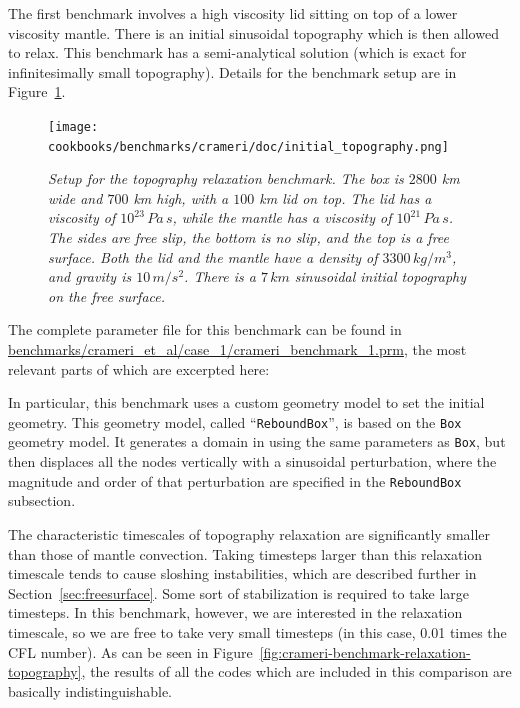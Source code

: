 \documentclass{article}
\begin{document}
The first benchmark involves a high viscosity lid sitting on top of a lower viscosity
mantle. There is an initial sinusoidal topography which is then allowed to relax.
This benchmark has a semi-analytical solution (which is exact for infinitesimally small
topography). Details for the benchmark setup are in Figure~\ref{fig:crameri-benchmark-initial-topography}.


\begin{figure}
  \begin{center}
    \texttt{[image: cookbooks/benchmarks/crameri/doc/initial\_topography.png]}
  \end{center}
  \caption{\it Setup for the topography relaxation benchmark. The box is $2800$ km wide and $700$ km high, with
    a $100$ km lid on top. The lid has a viscosity of $10^{23} \, {Pa\,s}$, while the mantle has a viscosity of $10^{21} \, {Pa\,s}$.  The sides are
    free slip, the bottom is no slip, and the top is a free surface.  Both the lid and the mantle have
    a density of $3300 \,{kg/m^3}$, and gravity is $10 \, {m/s^2}$. There is a $7 \, {km}$
    sinusoidal initial topography on the free surface.}
  \label{fig:crameri-benchmark-initial-topography}
\end{figure}

The complete parameter file for this benchmark can be found in
\url{benchmarks/crameri_et_al/case_1/crameri_benchmark_1.prm},
the  most relevant parts of which are excerpted here:

In particular, this benchmark uses a custom geometry model to set the initial geometry.
This geometry model, called ``\texttt{ReboundBox}'', is based on the \texttt{Box} geometry model.
It generates a domain in using the same parameters as \texttt{Box}, but then displaces all
the nodes vertically with a sinusoidal perturbation, where the magnitude and order of that
perturbation are specified in the \texttt{ReboundBox} subsection.


The characteristic timescales of topography relaxation are significantly smaller than those of
mantle convection. Taking timesteps larger than this relaxation timescale tends to cause sloshing
instabilities, which are described further in Section~\ref{sec:freesurface}. Some sort of stabilization
is required to take large timesteps. In this benchmark, however, we are interested in the relaxation
timescale, so we are free to take very small timesteps (in this case, 0.01 times the CFL
number).  As can be seen in Figure~\ref{fig:crameri-benchmark-relaxation-topography}, the results of all the
codes which are included in this comparison are basically indistinguishable.
\end{document}
